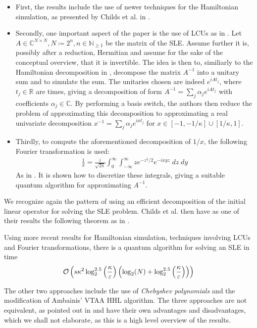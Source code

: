 \begin{itemize}
    \item First, the results include the use of newer techniques for the Hamiltonian simulation, as presented by Childs et al. in \cite{Berry2015}.
    \item Secondly, one important aspect of the paper is the use of LCUs as in \cite[pp. 5-8]{Childs2015}. Let \(A \in \mathbb{C}^{N \times N}, N \coloneqq 2^n, n \in \mathbb{N}_{\geq 1}\) be the matrix of the SLE. Assume further it is, possibly after a reduction, Hermitian and assume for the sake of the conceptual overview, that it is invertible. The idea is then to, similiarly to the Hamiltonian decomposition in , decompose the matrix \(A^{-1}\) into a unitary sum and to simulate the sum. The unitaries chosen are indeed \(e^{iAt_j}\), where \(t_j \in \mathbb{R}\) are times, giving a decomposition of form \(A^{-1} = \sum_{j}\alpha_je^{iAt_j}\) with coefficients \(\alpha_j \in \mathbb{C}\). By performing a basis switch, the authors then reduce the problem of approximating this decomposition to approximating a real univariate decomposition \(x^{-1} = \sum_j \alpha_j e^{ixt_j}\) for \(x \in [-1, -1/\kappa] \cup [1/\kappa, 1]\).
    \item Thirdly, to compute the aforementioned decomposition of \(1/x\), the following Fourier transformation is used:
    \begin{align}
        \frac{1}{x} = \frac{i}{\sqrt{2\pi}}\int_0^\infty\int_{-\infty}^\infty ze^{-z^2/2}e^{-ixyz} \; dz \; dy
    \end{align}
    As in \cite[pp. 10-11]{Childs2015}. It is shown how to discretize these integrals, giving a suitable quantum algorithm for approximating \(A^{-1}\).
\end{itemize}
We recognize again the pattern of using an efficient decomposition of the initial linear operator for solving the SLE problem. Childs et al. then have as one of their results the following theorem as in \cite[p. 4]{Childs2015}.
\begin{theorem}
    Using more recent results for Hamiltonian simulation, techniques involving LCUs and Fourier transformations, there is a quantum algorithm for solving an SLE in time
    \begin{align}
        \operatorname{\mathcal{O}}\left(s\kappa^2\log_2^{2.5}\left(\frac{\kappa}{\varepsilon}\right)\left(\log_2(N)+\log_2^{2.5}\left(\frac{\kappa}{\varepsilon}\right)\right)\right)
    \end{align}
\end{theorem}

The other two approaches include the use of \emph{Chebyshev polynomials} and the modification of Ambainis' VTAA HHL algorithm. The three approaches are not equivalent, as pointed out in \cite[p. 4]{Childs2015} and have their own advantages and disadvantages, which we shall not elaborate, as this is a high level overview of the results.
